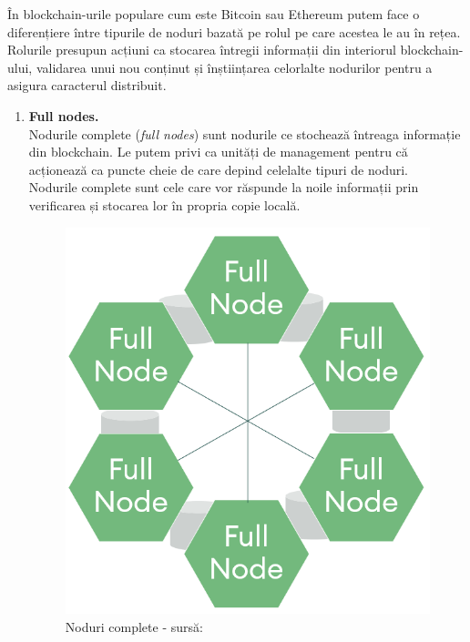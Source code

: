 În blockchain-urile populare cum este Bitcoin sau Ethereum putem face o diferențiere între tipurile de noduri bazată pe rolul pe care acestea le au în rețea. Rolurile presupun acțiuni ca stocarea întregii informații din interiorul blockchain-ului, validarea unui nou conținut și înștiințarea celorlalte nodurilor pentru a asigura caracterul distribuit.\\

\begin{enumerate}
    \item \textbf{Full nodes.} \\
    
    Nodurile complete (\textit{full nodes}) sunt nodurile ce stochează întreaga informație din blockchain. 
    Le putem privi ca unități de management pentru că acționează ca puncte cheie de care depind celelalte tipuri de noduri.\\
    
    Nodurile complete sunt cele care vor răspunde la noile informații prin verificarea și stocarea lor în propria copie locală.\\
    
    \begin{figure}[H]
    \centering
    \includegraphics[scale=0.35]{Images/BC_FullNodes.png}
    \caption{Noduri complete  - sursă: \cite{Blockchain_Node_Types}}
    \end{figure}
    

\end{enumerate}
